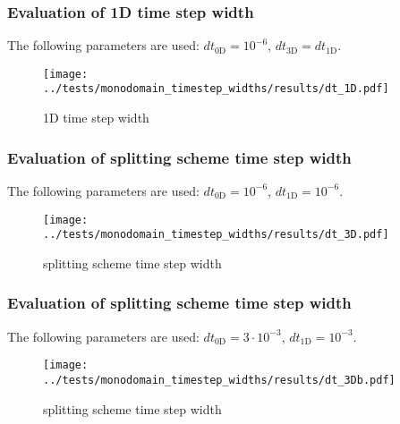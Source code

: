 \subsubsection{Evaluation of 1D time step width}
\vspace*{-0.2cm}
The following parameters are used: $dt_\text{0D}= 10^{-6}$, $dt_\text{3D} = dt_\text{1D}$.
\begin{figure}[h!]
  \centering%
  \texttt{[image: ../tests/monodomain\_timestep\_widths/results/dt\_1D.pdf]}%
  \caption{1D time step width}
\end{figure} 

\subsubsection{Evaluation of splitting scheme time step width}
\vspace*{-0.2cm}
The following parameters are used: $dt_\text{0D} = 10^{-6}$, $dt_\text{1D}= 10^{-6}$.
\begin{figure}[h!]
  \centering%
  \texttt{[image: ../tests/monodomain\_timestep\_widths/results/dt\_3D.pdf]}%
  \caption{splitting scheme time step width}
\end{figure} 

\subsubsection{Evaluation of splitting scheme time step width}
\vspace*{-0.2cm}
The following parameters are used: $dt_\text{0D}= 3\cdot 10^{-3}$, $dt_\text{1D} = 10^{-3}$.
\begin{figure}[h!]
  \centering%
  \texttt{[image: ../tests/monodomain\_timestep\_widths/results/dt\_3Db.pdf]}%
  \caption{splitting scheme time step width}
\end{figure} 


%
